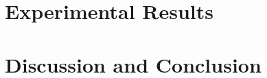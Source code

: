 \documentclass[conference,twocolumn,letterpaper]{IEEEtran}
\begin{document}

\section{Experimental Results}
\label{sec:Results}


\section{Discussion and Conclusion}
\label{sec:conclusion}

\end{document}
